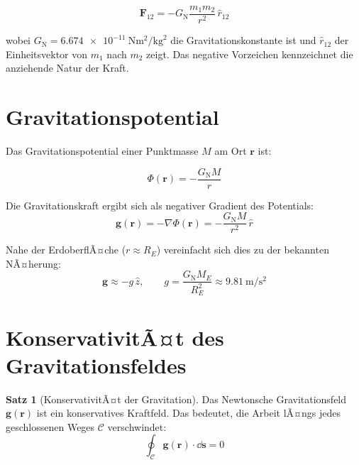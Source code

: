 ﻿\documentclass[12pt, a4paper]{report}
\theoremstyle{definition}
\newtheorem{theorem}{Satz}[section]
\theoremstyle{remark}
\newcommand{\G}{G_{\text{N}}}          %
\newcommand{\vek}[1]{\boldsymbol{#1}}
\begin{document}
\begin{equation}
  \vek{F}_{12} = -\G \frac{m_1 m_2}{r^2}\,\hat{r}_{12}
  \label{eq:newton_grav}
\end{equation}

wobei $\G = \SI{6.674e-11}{\newton\metre\squared\per\kilogram\squared}$ die
Gravitationskonstante ist und $\hat{r}_{12}$ der Einheitsvektor von $m_1$ nach
$m_2$ zeigt. Das negative Vorzeichen kennzeichnet die anziehende Natur der Kraft.

\section{Gravitationspotential}

Das Gravitationspotential einer Punktmasse $M$ am Ort $\vek{r}$ ist:

\begin{equation}
  \Phi(\vek{r}) = -\frac{\G M}{r}
  \label{eq:grav_potential}
\end{equation}

Die Gravitationskraft ergibt sich als negativer Gradient des Potentials:
\begin{equation}
  \vek{g}(\vek{r}) = -\nabla\Phi(\vek{r}) = -\frac{\G M}{r^2}\,\hat{r}
  \label{eq:grav_feld}
\end{equation}

Nahe der ErdoberflÃ¤che ($r \approx R_E$) vereinfacht sich dies zu der bekannten
NÃ¤herung:
\begin{equation}
  \vek{g} \approx -g\,\hat{z}, \qquad g = \frac{\G M_E}{R_E^2} \approx
  \SI{9.81}{\metre\per\second\squared}
\end{equation}

\section{KonservativitÃ¤t des Gravitationsfeldes}

\begin{theorem}[KonservativitÃ¤t der Gravitation]
  \label{thm:konservativ}
  Das Newtonsche Gravitationsfeld $\vek{g}(\vek{r})$ ist ein konservatives
  Kraftfeld. Das bedeutet, die Arbeit lÃ¤ngs jedes geschlossenen Weges $\mathcal{C}$
  verschwindet:
  \begin{equation}
    \oint_{\mathcal{C}} \vek{g}(\vek{r}) \cdot \dd\vek{s} = 0
    \label{eq:konservativ}
  \end{equation}
\end{theorem}
\end{document}
